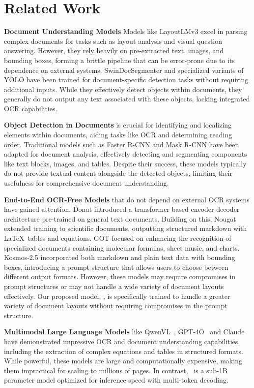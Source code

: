 \section{Related Work}
\textbf{Document Understanding Models} Models like LayoutLMv3 \cite{layoutlm3} excel in parsing complex documents for tasks such as layout analysis and visual question answering. However, they rely heavily on pre-extracted text, images, and bounding boxes, forming a brittle pipeline that can be error-prone due to its dependence on external systems. SwinDocSegmenter \cite{swindocsegmenter} and specialized variants of YOLO \cite{yolov5} have been trained for document-specific detection tasks without requiring additional inputs. While they effectively detect objects within documents, they generally do not output any text associated with these objects, lacking integrated OCR capabilities.

\textbf{Object Detection in Documents} is crucial for identifying and localizing elements within documents, aiding tasks like OCR and determining reading order. Traditional models such as Faster R-CNN \cite{ren2016faster} and Mask R-CNN \cite{he2017mask} have been adapted for document analysis, effectively detecting and segmenting components like text blocks, images, and tables. Despite their success, these models typically do not provide textual content alongside the detected objects, limiting their usefulness for comprehensive document understanding.

\textbf{End-to-End OCR-Free Models} that do not depend on external OCR systems have gained attention. Donut \cite{donut} introduced a transformer-based encoder-decoder architecture pre-trained on general text documents. Building on this, Nougat \cite{Nougat} extended training to scientific documents, outputting structured markdown with \LaTeX\ tables and equations. GOT \cite{GOT} focused on enhancing the recognition of specialized documents containing molecular formulas, sheet music, and charts. Kosmos-2.5 \cite{Kosmos} incorporated both markdown and plain text data with bounding boxes, introducing a prompt structure that allows users to choose between different output formats. However, these models may require compromises in prompt structures or may not handle a wide variety of document layouts effectively. Our proposed model, \eclair, is specifically trained to handle a greater variety of document layouts without requiring compromises in the prompt structure.

\textbf{Multimodal Large Language Models} like QwenVL~\cite{Qwen-VL}, GPT-4O~\cite{openai2024gpt4o} and Claude~\cite{anthropic2024claude} have demonstrated impressive OCR and document understanding capabilities, including the extraction of complex equations and tables in structured formats. While powerful, these models are large and computationally expensive, making them impractical for scaling to millions of pages. In contrast, \eclair\ is a sub-1B parameter model optimized for inference speed with multi-token decoding.